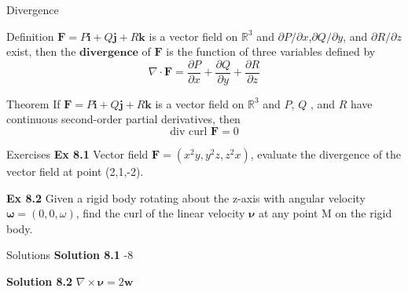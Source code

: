 \documentclass{beamer}
\begin{document}
\begin{frame}{Divergence}
    \begin{block}{Definition}
        $\boldsymbol{F}=P\boldsymbol{i}+Q\boldsymbol{j}+R\boldsymbol{k}$ is a vector field on $\mathbb{R}^3$ and $\partial P/\partial x$,$\partial Q/\partial y$, and $\partial R/\partial z$ exist, then the $\boldsymbol{divergence}$ of $\boldsymbol{F}$ is the  function of three variables defined by
        \begin{equation*}
            \nabla \cdot \boldsymbol{F} = \frac{\partial P}{\partial x}+\frac{\partial Q}{\partial y}+\frac{\partial R}{\partial z}
        \end{equation*}
    \end{block}

    \begin{block}{Theorem}
        If $\boldsymbol{F}=P\boldsymbol{i}+Q\boldsymbol{j}+R\boldsymbol{k}$ is a vector field on $\mathbb{R}^3$ and $P$, $Q$ , and $R$ have continuous second-order partial derivatives, then
        \begin{equation*}
        \text{div curl }\boldsymbol{F}=0
        \end{equation*}
    \end{block}
\end{frame}

\begin{frame}{Exercises}
    \textbf{Ex 8.1} Vector field $\boldsymbol{F}=(x^2y,y^2z,z^2x)$, evaluate the divergence of  the vector field at point (2,1,-2).\\
    \par
    \textbf{Ex 8.2} Given a rigid body rotating about the z-axis with angular velocity $\boldsymbol{\omega}=(0,0,\omega)$, find the curl of the linear velocity $\boldsymbol{\nu}$ at any point M on the rigid body.\\
    \par
\end{frame}

\begin{frame}{Solutions}
    \textbf{Solution 8.1} -8\\
    \par
    \textbf{Solution 8.2} $\nabla\times \boldsymbol{\nu}=2\boldsymbol{w}$
\end{frame}
\end{document}
